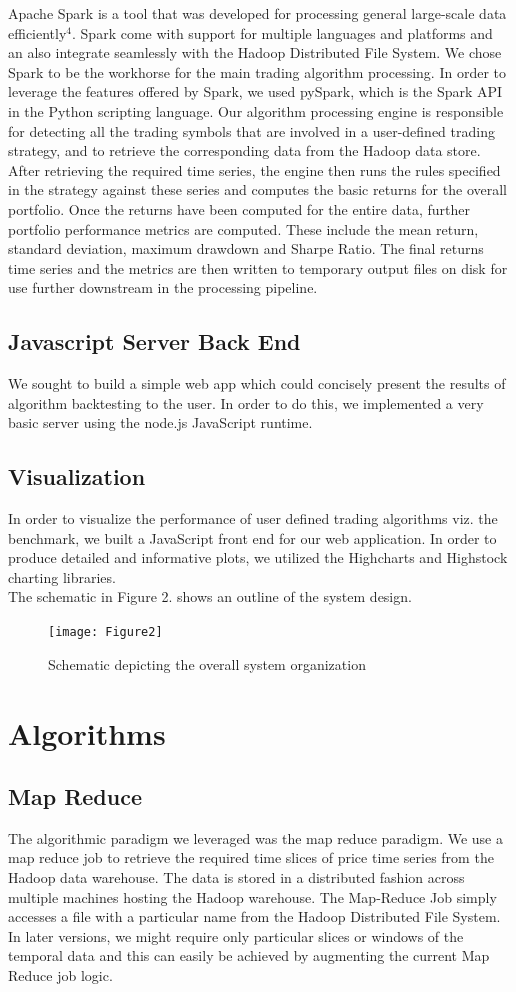 \documentclass[10pt, conference, compsocconf]{IEEEtran}
\begin{document}
Apache Spark is a tool that was developed for processing general large-scale data efficiently$^4$. Spark come with support for multiple languages and platforms and an also integrate seamlessly with the Hadoop Distributed File System. We chose Spark to be the workhorse for the main trading algorithm processing. In order to leverage the features offered by Spark, we used pySpark, which is the Spark API in the Python scripting language. Our algorithm processing engine is responsible for detecting all the trading symbols that are involved in a user-defined trading strategy, and to retrieve the corresponding data from the Hadoop data store. After retrieving the required time series, the engine then runs the rules specified in the strategy against these series and computes the basic returns for the overall portfolio. Once the returns have been computed for the entire data, further portfolio performance metrics are computed. These include the mean return, standard deviation, maximum drawdown and Sharpe Ratio. The final returns time series and the metrics are then written to temporary output files on disk for use further downstream in the processing pipeline. 
\subsection{Javascript Server Back End}
We sought to build a simple web app which could concisely present the results of algorithm backtesting to the user. In order to do this, we implemented a very basic server using the node.js JavaScript runtime. 
\subsection{Visualization} 
In order to visualize the performance of user defined trading algorithms viz. the benchmark, we built a JavaScript front end for our web application. In order to produce detailed and informative plots, we utilized the Highcharts and Highstock charting libraries.
\\
The schematic in Figure 2. shows an outline of the system design.
\begin{figure}
  \texttt{[image: Figure2]}
  \caption{Schematic depicting the overall system organization}
\end{figure}


\section{Algorithms} 
\subsection{Map Reduce}
The algorithmic paradigm we leveraged was the map reduce paradigm. We use a map reduce job to retrieve the required time slices of price time series from the Hadoop data warehouse. The data is stored in a distributed fashion across multiple machines hosting the Hadoop warehouse. The Map-Reduce Job simply accesses a file with a particular name from the Hadoop Distributed File System. In later versions, we might require only particular slices or windows of the temporal data and this can easily be achieved by augmenting the current Map Reduce job logic.
\end{document}
